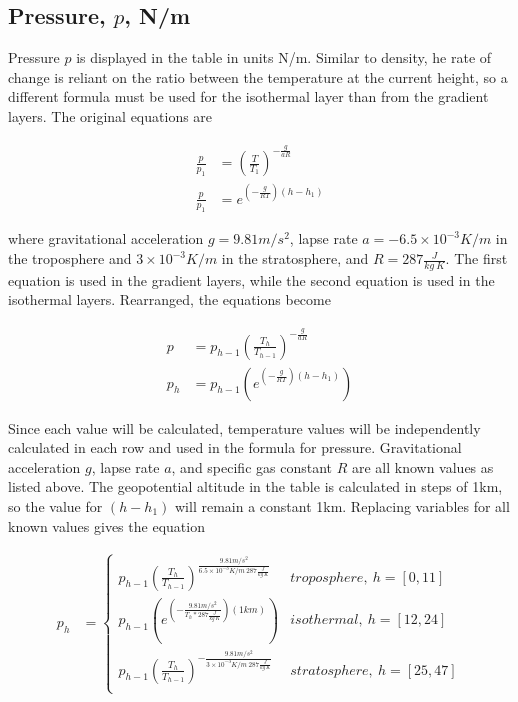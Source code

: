 \documentclass{article}
\begin{document}
\subsection{Pressure, \texorpdfstring{$p$}{}, N/m}
Pressure $p$ is displayed in the table in units N/m. Similar to density, he rate of change is reliant on the ratio between the temperature at the current height, so a different formula must be used for the isothermal layer than from the gradient layers. The original equations are 

\begin{align*}
    \frac{p}{p_1} &= {\left(\frac{T}{T_1}\right)}^{-\frac{g}{aR}} \\
    \frac{p}{p_1} &= e^{\left(- \frac{g}{RT}\right)\left(h-h_1\right)}
\end{align*}

where gravitational acceleration $g = 9.81m/s^2$, lapse rate $a= -6.5\times10^{-3} K/m$ in the troposphere and $3\times10^{-3}K/m$ in the stratosphere, and $R = 287 \frac{J}{kg\ K}$. The first equation is used in the gradient layers, while the second equation is used in the isothermal layers. Rearranged, the equations become 

\begin{align*}
    p &= p_{h-1}{\left(\frac{T_h}{T_{h-1}}\right)}^{-\frac{g}{aR}} \\
    p_h &= p_{h-1}\left(e^{\left(- \frac{g}{RT}\right)\left(h-h_1\right)}\right)
\end{align*}

Since each value will be calculated, temperature values will be independently calculated in each row and used in the formula for pressure. Gravitational acceleration $g$, lapse rate $a$, and specific gas constant $R$ are all known values as listed above. The geopotential altitude in the table is calculated in steps of 1km, so the value for $(h-h_1)$ will remain a constant 1km. Replacing variables for all known values gives the equation

\begin{align}
    p_h &= \begin{cases}
    p_{h-1}{\left(\frac{T_h}{T_{h-1}}\right)}^{\frac{9.81 m/s^2}{6.5\times10^{-3}K/m\ 287 \frac{J}{kg\ K}}}    & troposphere,\ h = [0,11] \\
    p_{h-1}\left(e^{\left(- \frac{9.81 m/s^2}{T_h * 287 \frac{J}{kg\ K} }\right)\left(1 km\right)}\right)                                          & isothermal,\ h = [12,24] \\
    p_{h-1}{\left(\frac{T_h}{T_{h-1}}\right)}^{-\frac{9.81 m/s^2}{3\times10^{-3}K/m\ 287 \frac{J}{kg\ K}}}       & stratosphere,\ h = [25,47] \\
    \end{cases}
\end{align}
\end{document}
